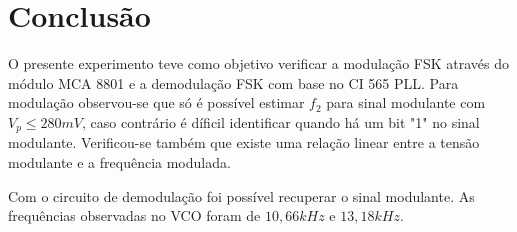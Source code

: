 \documentclass[12pt,a4paper]{article}%
\begin{document}
\newpage
\section{Conclusão}
O presente experimento teve como objetivo verificar a modulação FSK através do módulo MCA 8801 e a demodulação FSK com base no CI 565 PLL.
Para modulação observou-se que só é possível estimar $f_2$ para sinal modulante com $V_p\leq280mV$, caso contrário é díficil identificar quando há um bit "1" no sinal modulante.
Verificou-se também que existe uma relação linear entre a tensão modulante e a frequência modulada.

Com o circuito de demodulação foi possível recuperar o sinal modulante.
As frequências observadas no VCO foram de $10,66kHz$ e $13,18kHz$.

\nocite{taufik}


\end{document}
